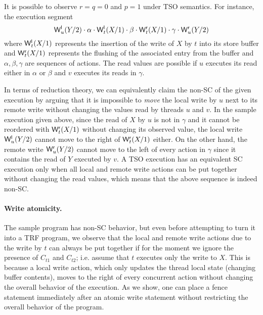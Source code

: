 \documentclass[preprint,9pt]{sigplanconf}
\begin{document}
It is possible to observe $r=q=0$ and $p=1$ under TSO semantics.
For instance, the execution segment
\[
\mathsf{W}^{\mathsf{l}}_{u}(Y/2)\cdot \alpha\cdot \mathsf{W}^{\mathsf{l}}_{t}(X/1)\cdot \beta\cdot \mathsf{W}^{\mathsf{r}}_{t}(X/1)\cdot \gamma\cdot \mathsf{W}^{\mathsf{r}}_{u}(Y/2) 
\]
where $\mathsf{W}^{\mathsf{l}}_{t}(X/1)$ represents the insertion of the write of $X$ by $t$ into its store buffer and $\mathsf{W}^{\mathsf{r}}_{t}(X/1)$ represents the flushing of the associated entry from the buffer and $\alpha,\beta,\gamma$ are sequences of actions.
The read values are possible if $u$ executes its read either in $\alpha$ or $\beta$ and $v$ executes its reads in $\gamma$.

In terms of reduction theory, we can equivalently claim the non-SC of the given execution by arguing that it is impossible to {\em move} the local write by $u$ next to its remote write without changing the values read by threads $u$ and $v$.
In the sample execution given above, since the read of $X$ by $u$ is not in $\gamma$ and it cannot be reordered with $\mathsf{W}^{\mathsf{r}}_{t}(X/1)$ without changing its observed value, the local write $\mathsf{W}^{\mathsf{l}}_{u}(Y/2)$ cannot move to the right of $\mathsf{W}^{\mathsf{r}}_{t}(X/1)$ either.
On the other hand, the remote write $\mathsf{W}^{\mathsf{r}}_{u}(Y/2)$ cannot move to the left of every action in $\gamma$ since it  contains the read of $Y$ executed by $v$. 
A TSO execution has an equivalent SC execution only when all local and remote write actions can be put together without changing the read values, which means that the above sequence is indeed non-SC.

\paragraph{Write atomicity.}
The sample program has non-SC behavior, but even before attempting to turn it into a TRF program, we observe that the local and remote write actions due to the write by $t$ can always be put together if for the moment we ignore the presence of $C_{t1}$ and $C_{t2}$; i.e. assume that $t$ executes only the write to $X$.
This is because a local write action, which only updates the thread local state (changing buffer contents), moves to the right of every concurrent action without changing the overall behavior of the execution.
As we show, one can place a fence statement immediately after an atomic write statement without restricting the overall behavior of the program.
\end{document}
